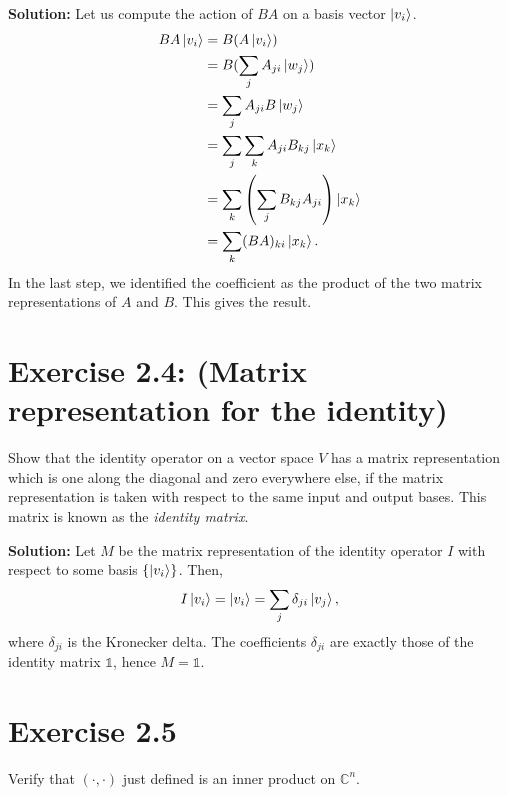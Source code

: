 \documentclass{book}
\begin{document}
    \textbf{Solution:} Let us compute the action of $BA$ on a basis vector $\ket{v_i}$.
    \begin{align}
    \begin{aligned}
        BA\ket{v_i} &= B(A\ket{v_i}) \\
        &= B(\sum_j A_{ji}\ket{w_j}) \\
        &= \sum_j A_{ji}B\ket{w_j} \\
        &= \sum_j\sum_k A_{ji}B_{kj}\ket{x_k} \\
        &= \sum_k \left(\sum_j B_{kj}A_{ji}\right) \ket{x_k} \\
        &= \sum_k (BA)_{ki} \ket{x_k}.
    \end{aligned}
    \end{align}
    In the last step, we identified the coefficient as the product of the two matrix representations of $A$ and $B$. This gives the result.
    
\section*{Exercise 2.4: (Matrix representation for the identity)}
    Show that the identity operator on a vector space $V$ has a matrix representation which is one along the diagonal and zero everywhere else, if the matrix representation is taken with respect to the same input and output bases. This matrix is known as the \emph{identity matrix}.
    
    \textbf{Solution:} Let $M$ be the matrix representation of the identity operator $I$ with respect to some basis $\left\{\ket{v_i}\right\}$. Then,
    \begin{align}
        I\ket{v_i} = \ket{v_i} = \sum_j \delta_{ji}\ket{v_j},
    \end{align}
    where $\delta_{ji}$ is the Kronecker delta. The coefficients $\delta_{ji}$ are exactly those of the identity matrix $\mathbb{1}$, hence $M = \mathbb{1}$.
    
\section*{Exercise 2.5}
    Verify that $(\cdot,\cdot)$ just defined is an inner product on $\mathbb{C}^n$.
    
\end{document}
